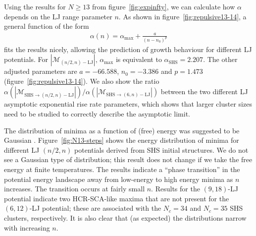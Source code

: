 Using the results for $N \geq 13$ from figure~\ref{fig:expinfty}, we can
calculate how $\alpha$ depends on the LJ range parameter $n$.  As shown in
figure~\ref{fig:repulsive13-14}, a general function of the form
\begin{align}
\label{expgrowth}
    \alpha(n)=\alpha_\text{max}+\frac{a}{(n-n_0)^{p}}
\end{align}
fits the results nicely, allowing the prediction of growth behaviour for different
LJ potentials. For $|\mathcal{M}_{(n/2,n)-\text{LJ}}|$, $\alpha_\text{max}$ is
equivalent to $\alpha_\text{SHS}=2.207$. The other adjusted parameters are
$a=-66.588$, $n_0=-3.386$ and $p=1.473$ (figure~\ref{fig:repulsive13-14}).
We also show the ratio $\alpha(|\mathcal{M}_{\text{SHS}\to (n/2,n)-\text{LJ}}|) /
	\alpha(|\mathcal{M}_{\text{SHS}\to (6,n)-\text{LJ}}|)$ between the two 
	different LJ asymptotic exponential rise rate parameters, which shows that larger
	cluster sizes need to be studied to correctly describe the asymptotic limit. 


The distribution of minima as a function of (free) energy was suggested to be
Gaussian \autocite{Sciortino-1999}. Figure~\ref{fig:N13-steps} shows the energy
distribution of minima for different LJ $(n/2,n)$ potentials derived from \ac{SHS}
initial structures. We do not see a Gaussian type of distribution; this 
result does not change if we take the free energy at finite temperatures. 
The results indicate a ``phase transition'' in the potential energy landscape away from low-energy to
high energy minima as $n$ increases.
The transition occurs at fairly small $n$. 
Results for the $(9,18)$-LJ potential indicate two HCR-SCA-like maxima that are not present for the $(6,12)$-LJ potential; these are associated with the $N_c = 34$ and $N_c = 35$ \ac{SHS} clusters,
respectively.
It is also clear that (as expected) the distributions narrow with increasing $n$.

